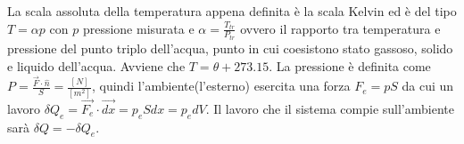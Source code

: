 \documentclass{article}
\begin{document}
La scala assoluta della temperatura appena definita è la scala Kelvin ed è del tipo $T=\alpha p$ con $p$ pressione misurata e $\alpha=\frac{T_{tr}}{P _{tr}}$ ovvero il rapporto tra temperatura e pressione del punto triplo dell'acqua, punto in cui coesistono stato gassoso, solido e liquido dell'acqua. Avviene che $T=\theta+273.15$.
La pressione è definita come $P=\frac{{\vec{F} \cdot \hat{n}}}{S}=\frac{[N]}{[m^2]}$, quindi l'ambiente(l'esterno) esercita una forza $F_e=pS$ da cui un lavoro $\delta Q_e=\vec{F_e}\cdot \vec{dx}=p_e Sdx=p_e dV$. Il lavoro che il sistema compie sull'ambiente sarà $\delta Q=-\delta Q_e$.
\end{document}
